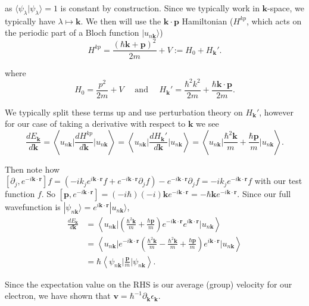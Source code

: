 \documentclass[12pt]{revtex4-2}
\begin{document}
as $\langle \psi_\lambda | \psi_\lambda \rangle=1$ is constant by construction.  Since we typically work in $\mathbf{k}$-space, we typically have $\lambda \mapsto \mathbf{k}$.  We then will use the $\mathbf{k}\cdot\mathbf{p}$ Hamiltonian ($H^{kp}$, which acts on the periodic part of a Bloch function $|u_{n\mathbf{k}}\rangle$)
\begin{equation}
    H^{kp} = \frac{(\hbar\mathbf{k} + \mathbf{p})^2}{2m} + V := H_0 + H_\mathbf{k}'.
\end{equation}

where
\begin{equation}
    H_0 = \frac{p^2}{2m} + V \quad \text{ and } \quad H_\mathbf{k}' = \frac{\hbar^2 k^2}{2m} + \frac{\hbar \mathbf{k}\cdot\mathbf{p}}{2m}.
\end{equation}

We typically split these terms up and use perturbation theory on $H_\mathbf{k}'$, however for our case of taking a derivative with respect to $\mathbf{k}$ we see
\begin{equation}
    \frac{dE_\mathbf{k}}{d\mathbf{k}} = \left\langle u_{n\mathbf{k}} \bigg| \frac{d H^{kp}}{d\mathbf{k}} \bigg| u_{n\mathbf{k}} \right\rangle = \left\langle u_{n\mathbf{k}} \bigg| \frac{d H_\mathbf{k}'}{d\mathbf{k}} \bigg| u_{n\mathbf{k}} \right\rangle = \left\langle u_{n\mathbf{k}} \bigg| \frac{\hbar^2 \mathbf{k}}{m} + \frac{\hbar\mathbf{p}}{m} \bigg| u_{n\mathbf{k}} \right\rangle.
\end{equation}

Then note how $[\partial_j,e^{-i\mathbf{k}\cdot\mathbf{r}}]f = (-ik_je^{i\mathbf{k}\cdot\mathbf{r}}f + e^{-i\mathbf{k}\cdot\mathbf{r}}\partial_j f) - e^{-i\mathbf{k}\cdot\mathbf{r}}\partial_j f = -ik_je^{-i\mathbf{k}\cdot\mathbf{r}}f$ with our test function $f$.  So $[\mathbf{p},e^{-i\mathbf{k}\cdot\mathbf{r}}] = (-i\hbar)(-i)\mathbf{k}e^{-i\mathbf{k}\cdot\mathbf{r}} = -\hbar\mathbf{k}e^{-i\mathbf{k}\cdot\mathbf{r}}$.  Since our full wavefunction is $|\psi_{n\mathbf{k}}\rangle = e^{i\mathbf{k}\cdot\mathbf{r}}|u_{n\mathbf{k}}\rangle$,
\begin{align}
    \frac{dE_\mathbf{k}}{d\mathbf{k}} &= \left\langle u_{n\mathbf{k}} \bigg| \left(\frac{\hbar^2 \mathbf{k}}{m} + \frac{\hbar\mathbf{p}}{m}\right) e^{-i\mathbf{k}\cdot\mathbf{r}}e^{i\mathbf{k}\cdot\mathbf{r}} \bigg| u_{n\mathbf{k}} \right\rangle \\
    &= \left\langle u_{n\mathbf{k}} \bigg|e^{-i\mathbf{k}\cdot\mathbf{r}} \left(\frac{\hbar^2 \mathbf{k}}{m} - \frac{\hbar^2 \mathbf{k}}{m} + \frac{\hbar\mathbf{p}}{m}\right) e^{i\mathbf{k}\cdot\mathbf{r}} \bigg| u_{n\mathbf{k}} \right\rangle \\
    &= \hbar\left\langle \psi_{n\mathbf{k}} \bigg| \frac{\mathbf{p}}{m} \bigg| \psi_{n\mathbf{k}} \right\rangle.
\end{align}

Since the expectation value on the RHS is our average (group) velocity for our electron, we have shown that $\mathbf{v} = \hbar^{-1}\partial_\mathbf{k}\epsilon_\mathbf{k}$.
\end{document}
